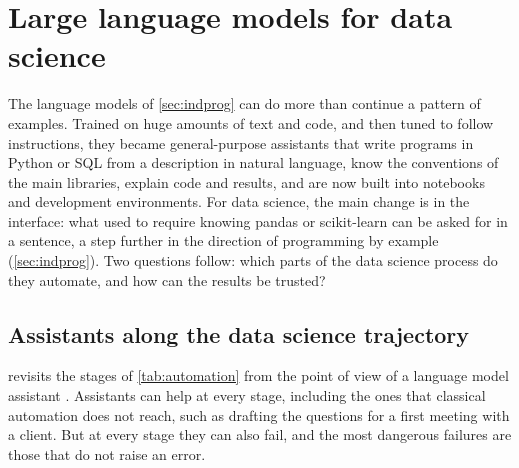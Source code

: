 \section{Large language models for data science}\label{sec:llmds}

The language models of \cref{sec:indprog} can do more than continue a pattern of examples. Trained on huge
amounts of text and code, and then tuned to follow instructions, they became general-purpose assistants that
write programs in Python or SQL from a description in natural language, know the conventions of the main
libraries, explain code and results, and are now built into notebooks and development environments. For data
science, the main change is in the interface: what used to require knowing pandas or scikit-learn
can be asked for in a sentence, a step further in the direction of programming by example (\cref{sec:indprog}).
Two questions follow: which parts of the data science process do they automate, and how can the results be
trusted?

\subsection{Assistants along the data science trajectory}

 revisits the stages of \cref{tab:automation} from the point of view of a language model
assistant \citep{debie2022automating,tornede2024automl}. Assistants can help at every stage, including the ones
that classical automation does not reach, such as drafting the questions for a first meeting with a client.
But at every stage they can also fail, and the most dangerous failures are those that do not raise an error.

